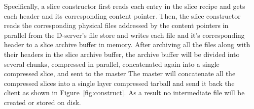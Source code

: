 Specifically, a slice constructor first reads each entry in the slice recipe
and gets each header and its corresponding content pointer.
%
Then, the slice constructor reads the corresponding physical files addressed by the content
pointers in parallel from the D-server's file store
%
and writes each file and it's corresponding header to a slice archive buffer in memory.
%
After archiving all the files along with their headers in the slice archive buffer,
the archive buffer will be divided into several chunks, compressed in parallel,
concatenated again into a single compressed slice, and sent to the master
%
%
%
%
%
The master will concatenate all the compressed slices into a single
layer compressed tarball and send it back the client as shown in Figure~\ref{fig:construct}.
As a result no intermediate file will be created or stored on disk. %
%

